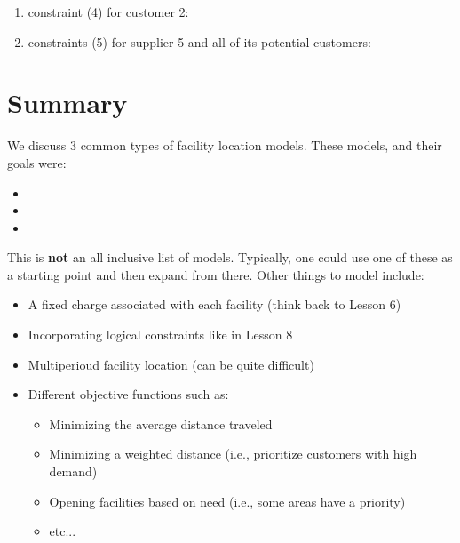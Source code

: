 \documentclass[11pt]{article}
\theoremstyle{definition}
\begin{document}
\begin{enumerate}[(a)]
\begin{enumerate}[i]
\vspace{2.2cm}


\item constraint (4) for customer 2:

\vspace{1cm}

\item constraints (5) for supplier 5 and all of its potential customers:

\vspace{1.9cm}
\end{enumerate}
\end{enumerate}

\newpage


\section{Summary}
We discuss 3 common types of facility location models. These models, and their goals were:
\begin{itemize}
\item \phantom{hi} 
\item \phantom{hi} \vspace{1in}
\item \phantom{hi} \vspace{1in}
\end{itemize}
\vspace{1in}

This is \textbf{not} an all inclusive list of models. Typically, one could use one of these as a starting point and then expand from there. Other things to model include:
	\begin{itemize}
	\item A fixed charge associated with each facility (think back to Lesson 6)
	\item Incorporating logical constraints like in Lesson 8
	\item Multiperioud facility location (can be quite difficult)
	\item Different objective functions such as:
		\begin{itemize}
		\item Minimizing the average distance traveled
		\item Minimizing a weighted distance (i.e., prioritize customers with high demand)
		\item Opening facilities based on need (i.e., some areas have a priority)
		\item etc...
		\end{itemize}
	\end{itemize}
\end{document}
